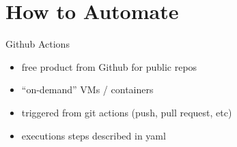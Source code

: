 \documentclass{beamer}
\begin{document}
\section{How to Automate}

\begin{frame}{Github Actions}
    \begin{itemize}
        \item free product from Github for public repos
        \item ``on-demand'' VMs / containers
        \item triggered from git actions (push, pull request, etc)
        \item executions steps described in yaml
    \end{itemize}
\end{frame}
\end{document}
